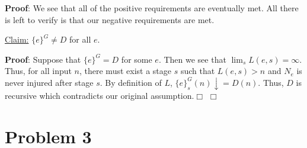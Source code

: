 \documentclass[11pt]{article}
\def\endproofmark{$\Box$}
\newenvironment{proof}{\par{\bf Proof}:}{\endproofmark\smallskip}
\begin{document}
\begin{proof}
We see that all of the positive requirements are eventually met. All there is left to verify is that our negative requirements are met. \newline

\underline{Claim:}  $\{e\}^G \neq D$ for all $e$. \newline
\begin{proof}
 Suppose that $\{e\}^G = D$ for some $e$. Then we see that $\lim_s L(e,s) = \infty$. Thus, for all input $n$, there must exist a stage $s$ such that $L(e,s) > n$ and $N_e$ is never injured after stage $s$. By definition of $L$, $\{e\}^G_s(n) \downarrow = D(n)$. Thus, $D$ is recursive which contradicts our original assumption.\end{proof}
\end{proof}

\section*{Problem 3}
\end{document}

